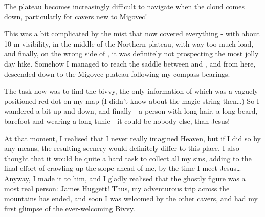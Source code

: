 \begin{marginfigure}
\checkoddpage \ifoddpage \forcerectofloat \else \forceversofloat \fi
\centering
 \caption{The plateau becomes increasingly difficult to navigate when the cloud comes down, particularly for cavers new to Migovec! }
 \label{plateau cloud gergely}
\end{marginfigure}

This was a bit complicated by the mist that now covered everything -
with about 10 m visibility, in the middle of the Northern plateau, with
way too much load, and finally, on the wrong side of , it was
definitely not prospecting the most jolly day hike. Somehow I managed to
reach the saddle between  and , and from here, descended down
to the Migovec plateau following my compass bearings.

The task now was to find the bivvy, the only information of which was a
vaguely positioned red dot on my map (I didn't know about the magic
string then\ldots{}) So I wandered a bit up and down, and finally  - a person with long hair, a long beard, barefoot and
wearing a long tunic - it could be nobody else, than Jesus! 

At that moment, I realised that I never really imagined Heaven, but if I
did so by any means, the resulting scenery would definitely differ to this
place. I also thought that it would be quite a hard task to collect all
my sins, adding to the final effort of crawling up the slope ahead of
me, by the time I meet Jesus\ldots{} Anyway, I made it to him, and I
gladly realised that the ghostly figure was a most real person: James
Huggett! Thus, my adventurous trip across the mountains has ended, and
soon I was welcomed by the other cavers, and had my first glimpse of the
ever-welcoming Bivvy.

